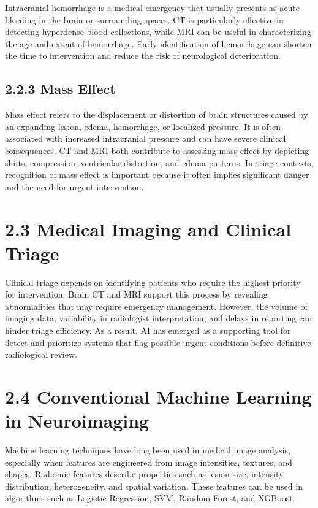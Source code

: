 \documentclass[12pt,a4paper]{report}
\begin{document}
Intracranial hemorrhage is a medical emergency that usually presents as acute bleeding in the brain or surrounding spaces. CT is particularly effective in detecting hyperdense blood collections, while MRI can be useful in characterizing the age and extent of hemorrhage. Early identification of hemorrhage can shorten the time to intervention and reduce the risk of neurological deterioration.

\subsection{2.2.3 Mass Effect}

Mass effect refers to the displacement or distortion of brain structures caused by an expanding lesion, edema, hemorrhage, or localized pressure. It is often associated with increased intracranial pressure and can have severe clinical consequences. CT and MRI both contribute to assessing mass effect by depicting shifts, compression, ventricular distortion, and edema patterns. In triage contexts, recognition of mass effect is important because it often implies significant danger and the need for urgent intervention.

\section{2.3 Medical Imaging and Clinical Triage}

Clinical triage depends on identifying patients who require the highest priority for intervention. Brain CT and MRI support this process by revealing abnormalities that may require emergency management. However, the volume of imaging data, variability in radiologist interpretation, and delays in reporting can hinder triage efficiency. As a result, AI has emerged as a supporting tool for detect-and-prioritize systems that flag possible urgent conditions before definitive radiological review.

\section{2.4 Conventional Machine Learning in Neuroimaging}

Machine learning techniques have long been used in medical image analysis, especially when features are engineered from image intensities, textures, and shapes. Radiomic features describe properties such as lesion size, intensity distribution, heterogeneity, and spatial variation. These features can be used in algorithms such as Logistic Regression, SVM, Random Forest, and XGBoost.
\end{document}
